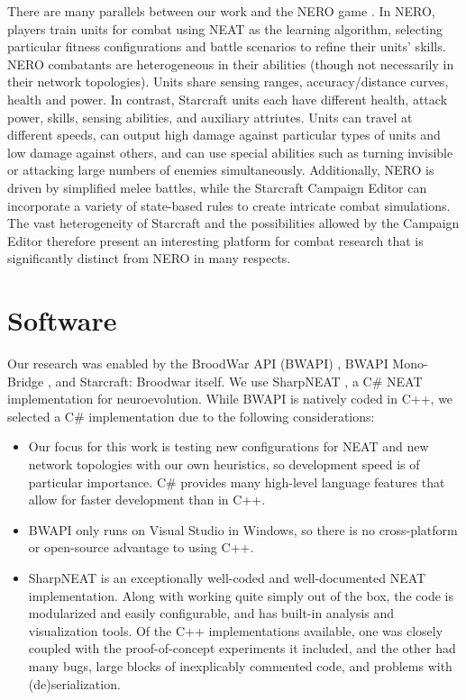 \documentclass[10pt,a4paper,twocolumn]{article}
\begin{document}
There are many parallels between our work and the NERO game \cite{stanley:ieeetec05}. In NERO, players train units for combat using NEAT as the learning algorithm, selecting particular fitness configurations and battle scenarios to refine their units' skills. NERO combatants are heterogeneous in their abilities (though not necessarily in their network topologies). Units share sensing ranges, accuracy/distance curves, health and power. In contrast, Starcraft units each have different health, attack power, skills, sensing abilities, and auxiliary attriutes. Units can travel at different speeds, can output high damage against particular types of units and low damage against others, and can use special abilities such as turning invisible or attacking large numbers of enemies simultaneously. Additionally, NERO is driven by simplified melee battles, while the Starcraft Campaign Editor can incorporate a variety of state-based rules to create intricate combat simulations. The vast heterogeneity of Starcraft and the possibilities allowed by the Campaign Editor therefore present an interesting platform for combat research that is significantly distinct from NERO in many respects.

\section{Software}
\label{sec:soft}

Our research was enabled by the BroodWar API (BWAPI) \cite{bwapi}, BWAPI Mono-Bridge \cite{monobridge}, and Starcraft: Broodwar itself. We use SharpNEAT \cite{sharpneat}, a C\# NEAT implementation for neuroevolution. While BWAPI is natively coded in C++, we selected a C\# implementation due to the following considerations:

\begin{itemize}
	\item Our focus for this work is testing new configurations for NEAT and new network topologies with our own heuristics, so development speed is of particular importance. C\# provides many high-level language features that allow for faster development than in C++.
	\item BWAPI only runs on Visual Studio in Windows, so there is no cross-platform or open-source advantage to using C++.
	\item SharpNEAT is an exceptionally well-coded and well-documented NEAT implementation. Along with working quite simply out of the box, the code is modularized and easily configurable, and has built-in analysis and visualization tools. Of the C++ implementations available, one was closely coupled with the proof-of-concept experiments it included, and the other had many bugs, large blocks of inexplicably commented code, and problems with (de)serialization.
\end{itemize}
\end{document}
